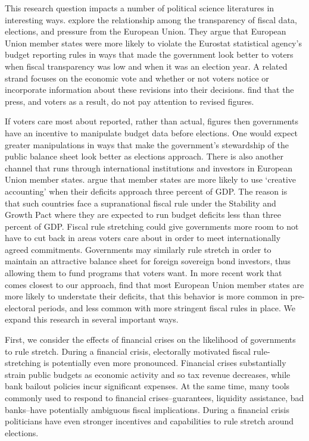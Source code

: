 \documentclass[]{article}
\begin{document}
This research question impacts a number of political science literatures in interesting ways. \cite{Alt2014} explore the relationship among the transparency of fiscal data, elections, and pressure from the European Union. They argue that European Union member states were more likely to violate the Eurostat statistical agency's budget reporting rules in ways that made the government look better to voters when fiscal transparency was low and when it was an election year. A related strand focuses on the economic vote and whether or not voters notice or incorporate information about these revisions into their decisions. \cite{KayserLeininger2015} find that the press, and voters as a result, do not pay attention to revised figures.

If voters care most about reported, rather than actual, figures then governments have an incentive to manipulate budget data before elections. One would expect greater manipulations in ways that make the government's stewardship of the public balance sheet look better as elections approach. There is also another channel that runs through international institutions and investors in European Union member states. \cite{vonHagenWolff2006} argue that member states are more likely to use `creative accounting' when their deficits approach three percent of GDP. The reason is that such countries face a supranational fiscal rule under the Stability and Growth Pact where they are expected to run budget deficits less than three percent of GDP. Fiscal rule stretching could give governments more room to not have to cut back in areas voters care about in order to meet internationally agreed commitments. Governments may similarly rule stretch in order to maintain an attractive balance sheet for foreign sovereign bond investors, thus allowing them to fund programs that voters want. In more recent work that comes closest to our approach, \cite{DeCastro2013} find that most European Union member states are more likely to understate their deficits, that this behavior is more common in pre-electoral periods, and less common with more stringent fiscal rules in place. We expand this research in several important ways.

First, we consider the effects of financial crises on the likelihood of governments to rule stretch. During a financial crisis, electorally motivated fiscal rule-stretching is potentially even more pronounced. Financial crises substantially strain public budgets as economic activity and so tax revenue decreases, while bank bailout policies incur significant expenses. At the same time, many tools commonly used to respond to financial crises--guarantees, liquidity assistance, bad banks--have potentially ambiguous fiscal implications. During a financial crisis politicians have even stronger incentives and capabilities to rule stretch around elections.
\end{document}
